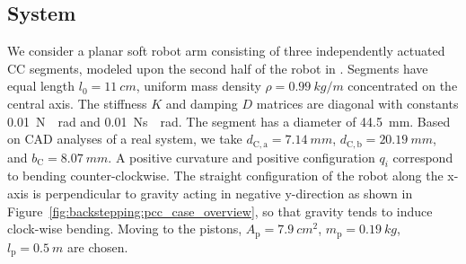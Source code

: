\subsection{System}
%
We consider a planar soft robot arm consisting of three independently actuated CC segments, modeled upon the second half of the robot in \cite{della2020model}. %
Segments have equal length $l_{0} = \SI{11}{cm}$, uniform mass density $\rho = \SI{0.99}{kg \per m}$ concentrated on the central axis. %
%
The stiffness $K$ and damping $D$ matrices are diagonal with constants \SI{0.01}{N \per rad} and \SI{0.01}{Ns \per rad}. The segment has a diameter of \SI{44.5}{mm}. Based on CAD analyses of a real system, we take $d_{\mathrm{C},\mathrm{a}} = \SI{7.14}{mm}$, $d_{\mathrm{C},\mathrm{b}} = \SI{20.19}{mm}$, and $b_\mathrm{C} = \SI{8.07}{mm}$.
%
A positive curvature and positive configuration $q_i$ correspond to bending counter-clockwise. 
The straight configuration of the robot along the x-axis is perpendicular to gravity acting in negative y-direction as shown in Figure~\ref{fig:backstepping:pcc_case_overview}, so that gravity tends to induce clock-wise bending.
%
Moving to the pistons, $A_\mathrm{p} = \SI{7.9}{cm^2}$, $m_\mathrm{p} = \SI{0.19}{kg}$, $l_\mathrm{p} = \SI{0.5}{m}$ are chosen.
